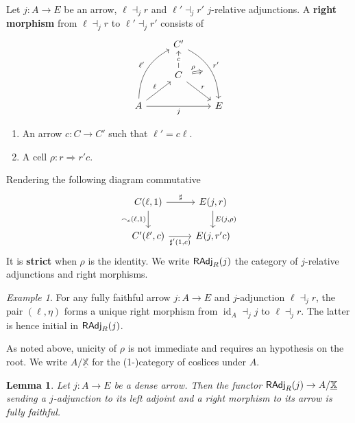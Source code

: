 \documentclass[10pt,a4paper]{article}
\newcommand{\bb}[1]{\mathbb{#1}}
\newcommand{\cat}[1]{\textcat{#1}}
\newcommand{\textcat}[1]{{\normalfont\textsf{#1}}}
\newcommand{\To}{\Rightarrow}
\DeclareMathOperator{\id}{id}
\theoremstyle{plain}
\newtheorem{lemma}[theorem]{Lemma}
\theoremstyle{definition}
\theoremstyle{remark}
\newtheorem{example}[theorem]{Example}
\begin{document}
\begin{definition}
    Let $j : A \to E$ be an arrow, $\ell\dashv_j r$ and $\ell'\dashv_jr'$ $j$-relative adjunctions. A \textbf{right morphism} from $\ell\dashv_jr$ to $\ell'\dashv_j r'$ consists of
    \[\begin{tikzcd}
        &C'\ar[ddr, "r'", bend left, ""{anchor=center,name=a}]&\\
        &\ar[u, "c"{description}] C \ar[dr, "r"]\\
        A \ar[uur, bend left, "\ell'"] \ar[ur, "\ell"] \ar[rr, "j"'] && E
        \ar[from=2-2, to=a, Rightarrow, "\rho", shorten=2mm]
    \end{tikzcd}\]
    \begin{enumerate}
        \item An arrow $c : C \to C'$ such that $\ell' = c\ell$.
        \item A cell $\rho : r \To r'c$.
    \end{enumerate}
    Rendering the following diagram commutative
    \[\begin{tikzcd}
        \ar[d, "{\smallfrown_c(\ell, 1)}"'] C(\ell, 1) \ar[r, "\sharp"] & E(j, r) \ar[d, "{E(j, \rho})"]\\
        C'(\ell', c) \ar[r, "{\sharp'(1, c)}"'] & E(j, r'c)
    \end{tikzcd}\]
    It is \textbf{strict} when $\rho$ is the identity. We write $\cat{RAdj}_R(j)$ the category of $j$-relative adjunctions and right morphisms.
\end{definition}

\begin{example}
    For any fully faithful arrow $j : A \to E$ and $j$-adjunction $\ell\dashv_j r$, the pair $(\ell, \eta)$ forms a unique right morphism from $\id_A\dashv_j j$ to $\ell\dashv_j r$. The latter is hence initial in $\cat{RAdj}_R(j)$.
\end{example}

As noted above, unicity of $\rho$ is not immediate and requires an hypothesis on the root. We write $A/\underline{\bb X}$ for the (1-)category of coslices under $A$.

\begin{lemma}
    \label{lem:lradj_ff}
    Let $j : A \to E$ be a dense arrow. Then the functor $\cat{RAdj}_R(j) \to A/\underline{\bb X}$ sending a $j$-adjunction to its left adjoint and a right morphism to its arrow is fully faithful.
\end{lemma}
\end{document}
